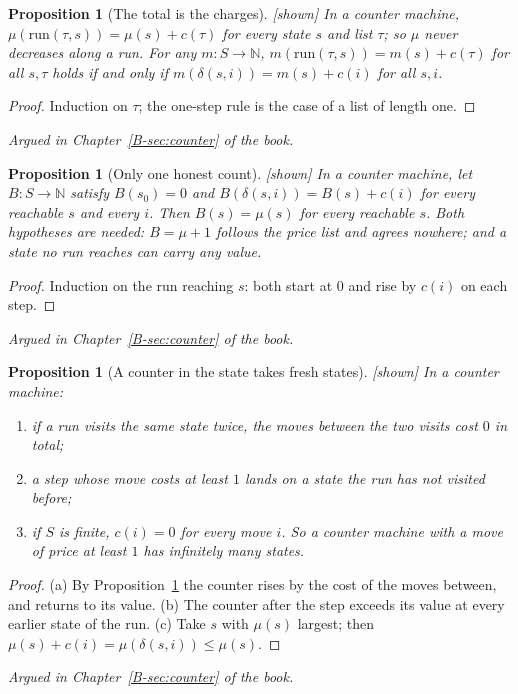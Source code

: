 \documentclass[11pt, a4paper]{article}
\theoremstyle{plain}
\newtheorem{proposition}[theorem]{Proposition}
\theoremstyle{definition}
\theoremstyle{remark}
\newcommand{\N}{\mathbb{N}}
\newcommand{\step}{\delta}
\newcommand{\cost}{c}
\newcommand{\run}{\mathrm{run}}
\newcommand{\argued}[1]{\par\noindent\textit{Argued in Chapter~\ref{B-#1} of the book.}\par}
\newcommand{\kind}[1]{\textup{[#1]}}
\begin{document}
\begin{proposition}[The total is the charges]\label{spec:conservation} \kind{shown}
In a counter machine, $\mu(\run(\tau,s))=\mu(s)+\cost(\tau)$ for every state $s$ and list $\tau$; so $\mu$ never
decreases along a run. For any $m:S\to\N$, $m(\run(\tau,s))=m(s)+\cost(\tau)$ for all $s,\tau$ holds if and only
if $m(\step(s,i))=m(s)+\cost(i)$ for all $s,i$.
\end{proposition}
\begin{proof}
Induction on $\tau$; the one-step rule is the case of a list of length one.
\end{proof}
\argued{sec:counter}

\begin{proposition}[Only one honest count]\label{spec:one-count} \kind{shown}
In a counter machine, let $B:S\to\N$ satisfy $B(s_0)=0$ and $B(\step(s,i))=B(s)+\cost(i)$ for every reachable
$s$ and every $i$. Then $B(s)=\mu(s)$ for every reachable $s$. Both hypotheses are needed: $B=\mu+1$ follows the
price list and agrees nowhere; and a state no run reaches can carry any value.
\end{proposition}
\begin{proof}
Induction on the run reaching $s$: both start at $0$ and rise by $\cost(i)$ on each step.
\end{proof}
\argued{sec:counter}

\begin{proposition}[A counter in the state takes fresh states]\label{spec:counter-fresh} \kind{shown}
In a counter machine:
\begin{enumerate}[label=(\alph*)]
\item if a run visits the same state twice, the moves between the two visits cost $0$ in total;
\item a step whose move costs at least $1$ lands on a state the run has not visited before;
\item if $S$ is finite, $\cost(i)=0$ for every move $i$. So a counter machine with a move of price at least
$1$ has infinitely many states.
\end{enumerate}
\end{proposition}
\begin{proof}
(a) By Proposition~\ref{spec:conservation} the counter rises by the cost of the moves between, and returns
to its value. (b) The counter after the step exceeds its value at every earlier state of the run.
(c) Take $s$ with $\mu(s)$ largest; then $\mu(s)+\cost(i)=\mu(\step(s,i))\le\mu(s)$.
\end{proof}
\argued{sec:counter}
\end{document}
